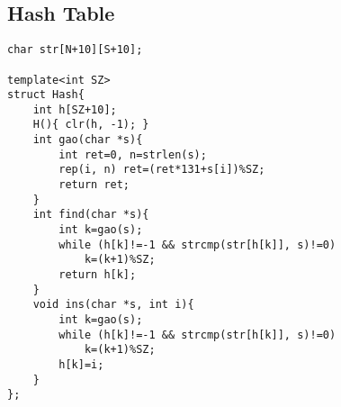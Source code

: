 \subsection{Hash Table}
\begin{lstlisting}
char str[N+10][S+10];

template<int SZ>
struct Hash{
	int h[SZ+10];
	H(){ clr(h, -1); }
	int gao(char *s){
		int ret=0, n=strlen(s);
		rep(i, n) ret=(ret*131+s[i])%SZ;
		return ret;
	}
	int find(char *s){
		int k=gao(s);
		while (h[k]!=-1 && strcmp(str[h[k]], s)!=0)
			k=(k+1)%SZ;
		return h[k];
	}
	void ins(char *s, int i){
		int k=gao(s);
		while (h[k]!=-1 && strcmp(str[h[k]], s)!=0)
			k=(k+1)%SZ;
		h[k]=i;
	}
};
\end{lstlisting}
